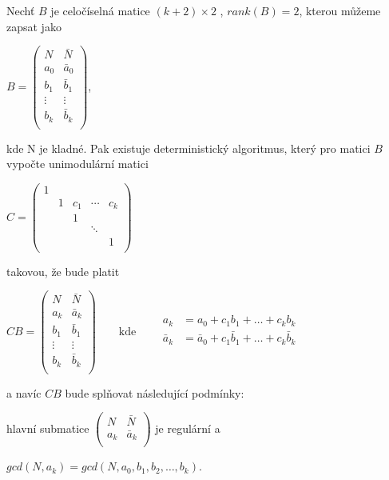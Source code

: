 \begin{vet} \label{gcd_red}
    Nechť $ B $ je celočíselná matice $ (k+2) \times 2 $ , $ rank(B) = 2 $, kterou
    můžeme zapsat jako
\begin{center}
$ B =
    \begin{pmatrix}
        N & \bar{N} \\
        a_0 & \bar{a}_0  \\
        b_1 & \bar{b}_1  \\
        \vdots & \vdots  \\
        b_k & \bar{b}_k  \\
    \end{pmatrix}
$,
\end{center}
kde N je kladné.
Pak existuje deterministický algoritmus, který pro matici $ B $ vypočte unimodulární
matici
\begin{center}
$ C =
    \begin{pmatrix}
        1 &    &     &        &     \\
          & 1  & c_1 & \cdots & c_k \\
          &    & 1   &        &     \\
          &    &     & \ddots &     \\
          &    &     &        & 1   \\
    \end{pmatrix}
$
\end{center}
takovou, že bude platit
\begin{center}
$ CB =
    \begin{pmatrix}
        N & \bar{N} \\
        a_k & \bar{a}_k  \\
        b_1 & \bar{b}_1  \\
        \vdots & \vdots  \\
        b_k & \bar{b}_k  \\
    \end{pmatrix}
\qquad \text{kde} \qquad
\begin{matrix}
    a_k &= a_0 + c_1 b_1 + \dots + c_k b_k \\
    \bar{a}_k &= \bar{a}_0 + c_1 \bar{b}_1 + \dots + c_k \bar{b}_k \\
\end{matrix}
$
\end{center}
a navíc $ CB $ bude splňovat následující podmínky:
\begin{Cond}
    \item hlavní submatice
    $
        \begin{pmatrix}
            N & \bar{N} \\
            a_k & \bar{a}_k  \\
        \end{pmatrix}
    $ je regulární a
    \item $ gcd(N, a_k) = gcd(N, a_0, b_1, b_2, \dots, b_k) $.
\end{Cond}
\end{vet}

